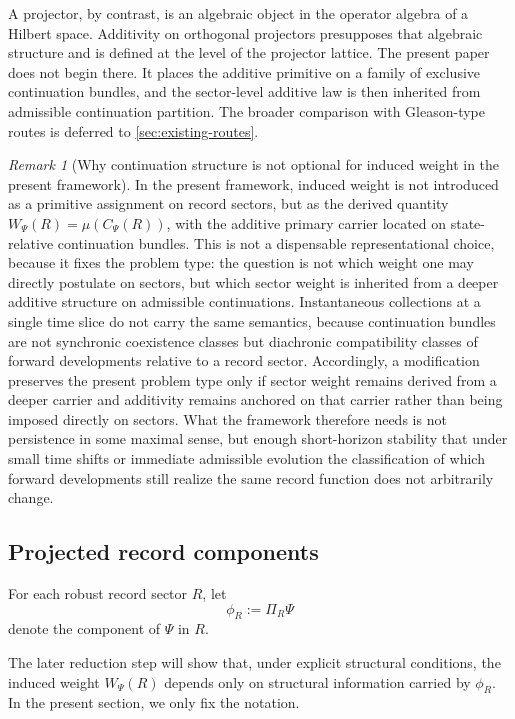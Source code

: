 \documentclass[11pt]{article}
\theoremstyle{remark}
\newtheorem{remark}{Remark}
\numberwithin{equation}{section}
\newcommand{\Wpsi}[1]{W_{\Psi}\!\left(#1\right)}
\newcommand{\Proj}[1]{\Pi_{#1}}
\begin{document}
A projector, by contrast, is an algebraic object in the operator
algebra of a Hilbert space. Additivity on orthogonal projectors
presupposes that algebraic structure and is defined at the level of
the projector lattice. The present paper does not begin there. It
places the additive primitive on a family of exclusive continuation
bundles, and the sector-level additive law is then inherited from
admissible continuation partition. The broader comparison with
Gleason-type routes is deferred to \cref{sec:existing-routes}.

\begin{remark}[Why continuation structure is not optional for induced weight in the present framework]
In the present framework, induced weight is not introduced as a
primitive assignment on record sectors, but as the derived quantity
\(W_\Psi(R)=\mu(C_\Psi(R))\), with the additive primary carrier
located on state-relative continuation bundles. This is not a
dispensable representational choice, because it fixes the problem
type: the question is not which weight one may directly postulate on
sectors, but which sector weight is inherited from a deeper additive
structure on admissible continuations. Instantaneous collections at a
single time slice do not carry the same semantics, because
continuation bundles are not synchronic coexistence classes but
diachronic compatibility classes of forward developments relative to a
record sector. Accordingly, a modification preserves the present
problem type only if sector weight remains derived from a deeper
carrier and additivity remains anchored on that carrier rather than
being imposed directly on sectors. What the framework therefore needs
is not persistence in some maximal sense, but enough short-horizon
stability that under small time shifts or immediate admissible
evolution the classification of which forward developments still
realize the same record function does not arbitrarily change.
\end{remark}

\subsection{Projected record components}

For each robust record sector $R$, let
\[
\phi_R := \Proj{R}\Psi
\]
denote the component of $\Psi$ in $R$.

The later reduction step will show that, under explicit structural conditions, the induced weight $\Wpsi{R}$ depends only on structural information carried by $\phi_R$. In the present section, we only fix the notation.
\end{document}
